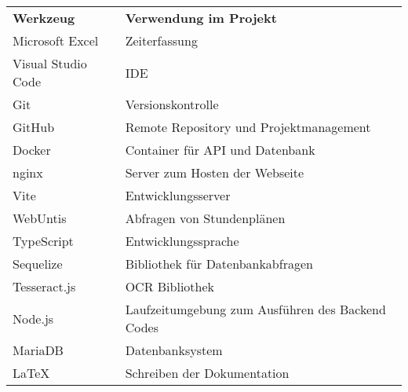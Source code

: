 
\begin{tabular}{|p{}|p{}|} \hline
    \textbf{Werkzeug} & \textbf{Verwendung im Projekt} \\ \hhline{|=|=|}
    Microsoft Excel & Zeiterfassung \\ \hline
    Visual Studio Code & IDE \\  \hline
    Git & Versionskontrolle \\ \hline
    GitHub & Remote Repository und Projektmanagement \\ \hline
    Docker & Container für API und Datenbank \\ \hline
    nginx & Server zum Hosten der Webseite \\ \hline
    Vite & Entwicklungsserver \\ \hline
    WebUntis & Abfragen von Stundenplänen \\ \hline
    TypeScript & Entwicklungssprache \\ \hline
    Sequelize & Bibliothek für Datenbankabfragen \\ \hline
    Tesseract.js & OCR Bibliothek \\ \hline
    Node.js & Laufzeitumgebung zum Ausführen des Backend Codes \\ \hline
    MariaDB & Datenbanksystem \\ \hline
    LaTeX & Schreiben der Dokumentation \\ \hline
\end{tabular}